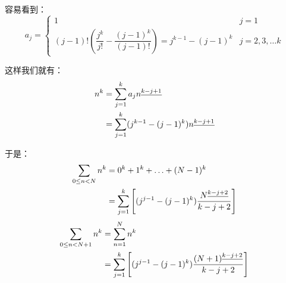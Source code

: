 \documentclass{article}
\begin{document}
\begin{CJK*}{UTF8}{gbsn}
容易看到：
\[
a_j =
\begin{cases}
1 & j = 1 \\
(j - 1)!\left( \dfrac{j^k}{j!} - \dfrac{(j - 1)^k}{(j - 1)!} \right) = j^{k - 1} - (j - 1)^k & j = 2, 3, \ldots k
\end{cases}
\]

这样我们就有：
\[
\begin{aligned}
n^k	& = \sum_{j = 1}^k a_j {n}^{\underline{k - j + 1}} \\
	& = \sum_{j = 1}^k (j^{k - 1} - (j - 1)^k) {n}^{\underline{k - j + 1}}
\end{aligned}
\]

于是：
\[
\begin{aligned}
\sum_{0 \leq n < N} n^k	& = 0^k + 1^k + \ldots + (N - 1)^k \\
						& = \sum_{j = 1}^k \left[ (j^{j - 1} - (j - 1)^k) \dfrac{{N}^{\underline{k - j + 2}}}{k - j + 2} \right]
\end{aligned}
\]
\[
\begin{aligned}
\sum_{0 \leq n < N + 1} n^k	& = \sum_{n = 1}^N n^k \\
							& = \sum_{j = 1}^k \left[ (j^{j - 1} - (j - 1)^k) \dfrac{{(N + 1)}^{\underline{k - j + 2}}}{k - j + 2} \right]
\end{aligned}
\]

\end{CJK*}
\end{document}

